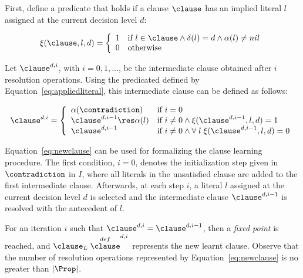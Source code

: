 \begin{definition}%
\label{def:clauselearning}
    First, define a predicate that holds if a clause $\clause$ has an implied
    literal $l$ assigned at the current decision level $d$:

    \begin{equation}%
        \label{eq:appliedliteral}
        \xi(\clause, l, d) = 
        \left\{
            \begin{array}{ll}
                1 & \text{if $l \in \clause \land \delta(l) = d \land \alpha(l) \neq nil$} \\
                0 & \text{otherwise}
            \end{array}
        \right.
    \end{equation}

    Let $\clause^{d, i}$, with $i = 0, 1, \ldots$, be the intermediate clause
    obtained after $i$ resolution operations. Using the predicated defined
    by Equation~\ref{eq:appliedliteral}, this intermediate clause can be defined
    as follows:

    \begin{equation}%
        \label{eq:newclause}
        \clause^{d,i} = 
        \left\{
            \begin{array}{ll}
                \alpha(\contradiction) & \text{if $i=0$}\\
                \clause^{d,i-1} \res \alpha(l) & \text{if $i \neq 0 \land \xi(\clause^{d,i-1}, l, d) = 1$}\\
                \clause^{d, i-1} & \text{if $i \neq 0 \land \forall\;l\;\xi(\clause^{d, i-1}, l, d) = 0$}
            \end{array}
        \right.
    \end{equation}
\end{definition}

Equation~\ref{eq:newclause} can be used for formalizing the clause learning
procedure. The first condition, $i = 0$, denotes the initialization step given
in $\contradiction$ in $I$, where all literals in the unsatisfied clause are added to
the first intermediate clause. Afterwards, at each step $i$, a literal $l$
assigned at the current decision level $d$ is selected and the intermediate
clause $\clause^{d, i-1}$ is resolved with the antecedent of $l$.

For an iteration $i$ such that $\clause^{d, i} = \clause^{d, i-1}$, then a
\emph{fixed point} is reached, and $\clause_L \stackrel{def} \clause^{d, i}$
represents the new learnt clause. Observe that the number of resolution
operations represented by Equation~\ref{eq:newclause} is no greater than
$|\Prop|$.

